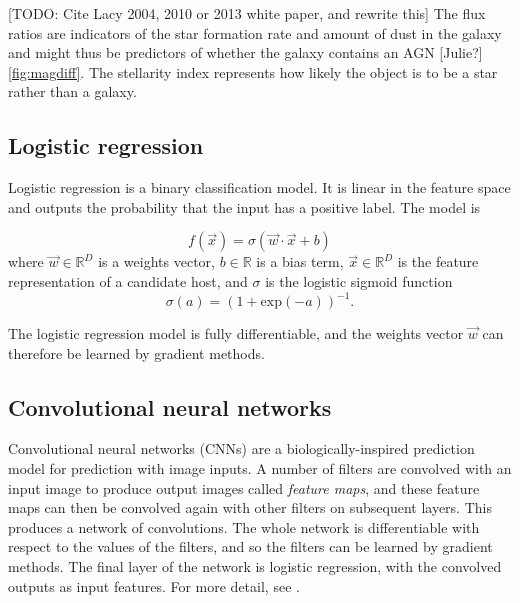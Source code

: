 \documentclass[fleqn,usenatbib,usedcolumn]{mnras}
\begin{document}
    [TODO: Cite Lacy 2004, 2010 or 2013 white paper, and rewrite this] The
    flux ratios are indicators of the star formation rate and amount of dust
    in the galaxy and might thus be predictors of whether the galaxy contains
    an AGN {[}Julie?{]} \ref{fig:magdiff}. The stellarity index represents how
    likely the object is to be a star rather than a galaxy.

  \subsection{Logistic regression}\label{logistic-regression}

    Logistic regression is a binary classification model. It is linear in the
    feature space and outputs the probability that the input has a positive
    label. The model is

    \begin{equation}
        f(\vec x) = \sigma(\vec w \cdot \vec x + b)
    \end{equation}
    where $\vec w \in \mathbb{R}^D$ is a weights vector,
    $b \in \mathbb{R}$ is a bias term, $\vec x \in \mathbb{R}^D$ is the
    feature representation of a candidate host, and $\sigma$ is the
    logistic sigmoid function \begin{equation}
        \sigma(a) = (1 + \mathrm{exp}(-a))^{-1}.
    \end{equation}

    The logistic regression model is fully differentiable, and the weights vector $\vec w$ can therefore be learned by gradient methods.

  \subsection{Convolutional neural
  networks}\label{convolutional-neural-networks}

    Convolutional neural networks (CNNs) are a biologically-inspired
    prediction model for prediction with image inputs. A number of filters
    are convolved with an input image to produce output images called \emph{feature maps}, and these feature maps can then be convolved again with other filters on subsequent layers. This produces a network of convolutions. The whole network is
    differentiable with respect to the values of the filters, and so the
    filters can be learned by gradient methods. The final layer of the
    network is logistic regression, with the convolved outputs as input
    features. For more detail, see \citet[\S II.A][]{lecun98}.
\end{document}
